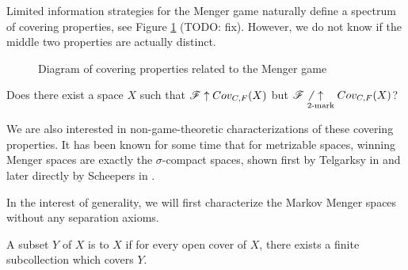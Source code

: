 Limited information strategies for the Menger game naturally define a spectrum
of covering properties, see Figure \ref{menSpec} (TODO: fix). However,
we do not know if the middle two properties are actually distinct.

\begin{figure}[h]\label{menSpec}
\begin{center}
\end{center}
\caption{Diagram of covering properties related to the Menger game}
\end{figure}

\begin{ques}\label{perfectTo2Mark}
  Does there exist a space $X$ such that $\mathscr{F} \uparrow Cov_{C,F}(X)$ but
  $\mathscr{F} \not\underset{2\text{-mark}}{\uparrow} Cov_{C,F}(X)$?
\end{ques}

We are also interested in non-game-theoretic characterizations of these
covering properties. It has been known for some time that for metrizable spaces,
winning Menger spaces are exactly the $\sigma$-compact spaces, shown first
by Telgarksy in \cite{MR753073} and later directly by Scheepers in
\cite{MR1273523}.

In the interest of generality, we will first characterize the Markov Menger
spaces without any separation axioms.

\begin{defn}
  A subset $Y$ of $X$ is  to $X$ if for every open
  cover of $X$, there exists a finite subcollection which covers $Y$.
\end{defn}

